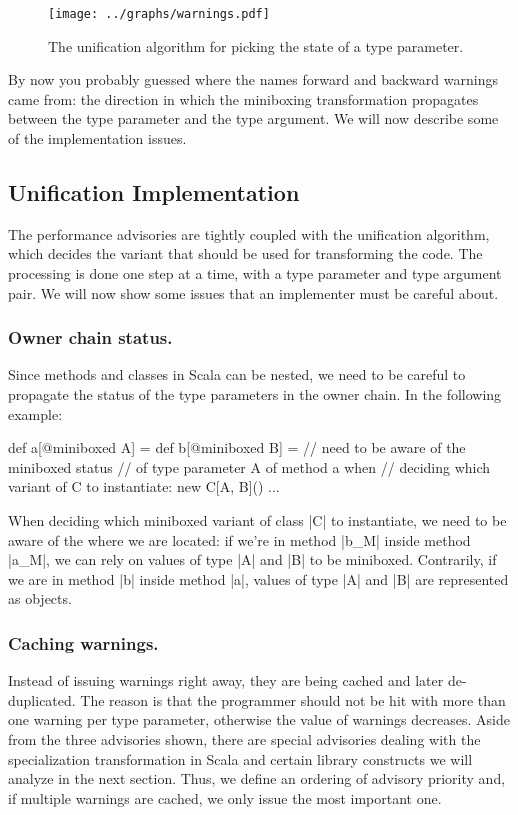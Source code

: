 \begin{figure}[t!]
  \label{fig:algorithm}
  \centering
  \texttt{[image: ../graphs/warnings.pdf]}
  \vspace{0.01\textheight}
  \caption{The unification algorithm for picking the state of a type parameter.}
\end{figure}

By now you probably guessed where the names forward and backward warnings came from: the direction in which the miniboxing transformation propagates between the type parameter and the type argument. We will now describe some of the implementation issues.

\subsection{Unification Implementation}

The performance advisories are tightly coupled with the unification algorithm, which decides the variant that should be used for transforming the code. The processing is done one step at a time, with a type parameter and type argument pair. We will now show some issues that an implementer must be careful about.

\subsubsection{Owner chain status.} Since methods and classes in Scala can be nested, we need to be careful to propagate the status of the type parameters in the owner chain. In the following example:

\begin{lstlisting-nobreak}
 def a[@miniboxed A] = {
   def b[@miniboxed B] = {
     // need to be aware of the miniboxed status
     // of type parameter A of method a when
     // deciding which variant of C to instantiate:
     new C[A, B]()
   }
   ...
 }
\end{lstlisting-nobreak}

When deciding which miniboxed variant of class |C| to instantiate, we need to be aware of the where we are located: if we're in method |b_M| inside method |a_M|, we can rely on values of type |A| and |B| to be miniboxed. Contrarily, if we are in method |b| inside method |a|, values of type |A| and |B| are represented as objects.

\subsubsection{Caching warnings.} Instead of issuing warnings right away, they are being cached and later de-duplicated. The reason is that the programmer should not be hit with more than one warning per type parameter, otherwise the value of warnings decreases. Aside from the three advisories shown, there are special advisories dealing with the specialization transformation in Scala and certain library constructs we will analyze in the next section. Thus, we define an ordering of advisory priority and, if multiple warnings are cached, we only issue the most important one.

